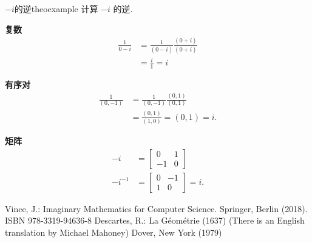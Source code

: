 \begin{myexample}{\boldmath$-i$的逆}{theoexample}
计算 $-i$ 的逆.

\textbf{复数}
$$
  \begin{aligned}
    \frac{1}{0-i} & =\frac{1}{(0-i)} \frac{(0+i)}{(0+i)} \\
                  & =\frac{i}{1}=i
  \end{aligned}
$$

\textbf{有序对}
$$
  \begin{aligned}
    \frac{1}{(0,-1)} & =\frac{1}{(0,-1)} \frac{(0,1)}{(0,1)} \\
                     & =\frac{(0,1)}{(1,0)}=(0,1)=i .
  \end{aligned}
$$

\textbf{矩阵}
$$
  \begin{aligned}
    -i      & =\left[\begin{array}{cc}
        0  & 1 \\
        -1 & 0
      \end{array}\right]     \\
    -i^{-1} & =\left[\begin{array}{cc}
        0 & -1 \\
        1 & 0
      \end{array}\right]=i .
  \end{aligned}
$$
\end{myexample}



\begin{thebibliography}{99}
   Vince, J.: Imaginary Mathematics for Computer Science. Springer, Berlin (2018). ISBN 978-3319-94636-8
   Descartes, R.: La Géométrie (1637) (There is an English translation by Michael Mahoney) Dover, New York (1979)
\end{thebibliography}
